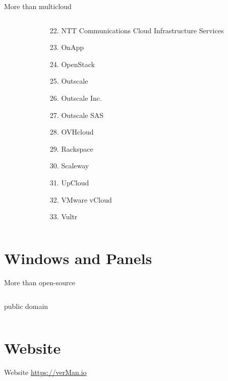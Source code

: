 \documentclass[aspectratio=169]{beamer}
\begin{document}
\begin{frame}{More than multicloud}
\begin{columns}
\begin{column}{0.3\textwidth}
        \end{column}
        \begin{column}{0.3\textwidth}  %
            \begin{enumerate}[<+->]
                \setcounter{enumi}{21}
                \item NTT Communications Cloud Infrastructure Services
                \item OnApp
                \item OpenStack
                \item Outscale
                \item Outscale Inc.
                \item Outscale SAS
                \item OVHcloud
                \item Rackspace
                \item Scaleway
                \item UpCloud
                \item VMware vCloud
                \item Vultr
            \end{enumerate}
        \end{column}
    \end{columns}
\end{frame}

\section{Windows and Panels}

\begin{frame}{More than open-source}
    \begin{columns}
        \begin{column}{0.5\textwidth}
  \begin{tvWindow}[License]
    \begin{center}
    public domain
    \end{center}
  \end{tvWindow}
\end{column}
\end{columns}
\end{frame}

\section{Website}
\begin{frame}{Website}
    \centering
    \Large
    \href{https://verMan.io}{https://verMan.io}
\end{frame}
\end{document}
